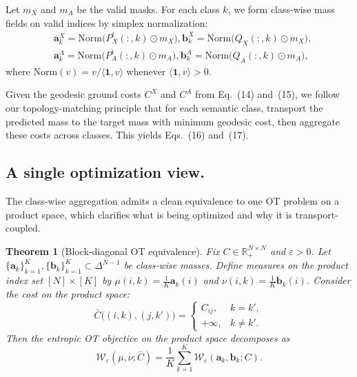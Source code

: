 \documentclass[numsec,webpdf,contemporary,large]{oup-authoring-template}%
\theoremstyle{thmstyleone}%
\newtheorem{theorem}{Theorem}%
\theoremstyle{thmstyletwo}%
\theoremstyle{thmstylethree}%
\begin{document}
Let $m_X$ and $m_A$ be the valid masks.
For each class $k$, we form class-wise mass fields on valid indices by simplex normalization:
\begin{align}
&\mathbf{a}_k^{X}=\mathrm{Norm}\!\big(P_X^{t}(:,k)\odot m_X\big),
\mathbf{b}_k^{X}=\mathrm{Norm}\!\big(Q_X(:,k)\odot m_X\big),
\\
&\mathbf{a}_k^{A}=\mathrm{Norm}\!\big(P_A^{t}(:,k)\odot m_A\big),
\mathbf{b}_k^{A}=\mathrm{Norm}\!\big(Q_A(:,k)\odot m_A\big),
\end{align}
where $\mathrm{Norm}(v)=v/\langle \mathbf{1},v\rangle$ whenever $\langle \mathbf{1},v\rangle>0$.

Given the geodesic ground costs $C^X$ and $C^A$ from Eq.~(14) and~(15), we follow our topology-matching principle that
for each semantic class, transport the predicted mass to the target mass with minimum geodesic cost,
then aggregate these costs across classes. This yields Eqs.~(16) and~(17).

\subsection{A single optimization view.} The class-wise aggregation admits a clean equivalence to one OT problem on a product space, which clarifies what is being optimized and why it is transport-coupled.

\begin{theorem}[Block-diagonal OT equivalence]
\label{thm:block_equiv}
Fix $C\in\mathbb{R}_+^{N \times N}$ and $\varepsilon>0$. Let $\{\mathbf{a}_k\}_{k=1}^{K},\{\mathbf{b}_k\}_{k=1}^{K}\subset \Delta^{N-1}$ be class-wise masses. Define measures on the product index set $[N]\times[K]$ by $\mu(i,k)=\frac{1}{K}\mathbf{a}_k(i)$ and $\nu(i,k)=\frac{1}{K}\mathbf{b}_k(i)$. Consider the cost on the product space:
\begin{equation}
\bar{C}\big((i,k),(j,k')\big)=
\begin{cases}
C_{ij}, & k=k',\\
+\infty, & k\neq k'.
\end{cases}
\end{equation}
Then the entropic OT objective on the product space decomposes as
\begin{equation}
\mathcal{W}_{\varepsilon}(\mu,\nu;\bar{C})
=
\frac{1}{K}\sum_{k=1}^{K}\mathcal{W}_{\varepsilon}(\mathbf{a}_k,\mathbf{b}_k;C).
\end{equation}
\end{theorem}
\end{document}
